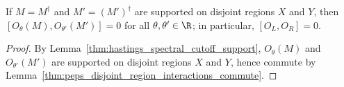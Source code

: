 \begin{lemma}
    \label{thm:hastings_spectral_cutoff_commute}
    If $M=M^\dagger$ and $M'=(M')^\dagger$ are supported on disjoint regions
    $X$ and $Y$, then $[O_\theta(M),O_{\theta'}(M')]=0$ for all
    $\theta,\theta'\in\R$; in particular, $[O_L,O_R]=0$.
\end{lemma}
\begin{proof}
    By Lemma~\ref{thm:hastings_spectral_cutoff_support}, $O_\theta(M)$ and
    $O_{\theta'}(M')$ are supported on disjoint regions $X$ and $Y$, hence
    commute by Lemma~\ref{thm:peps_disjoint_region_interactions_commute}.
\end{proof}
